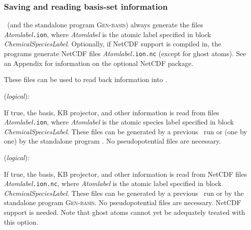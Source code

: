 \subsubsection{Saving and reading basis-set information}

\siesta\ (and the standalone program \textsc{Gen-basis})
always generate the files
\textit{Atomlabel}\texttt{.ion}, where \textit{Atomlabel} is the atomic label
specified in block \textit{ChemicalSpeciesLabel}.  Optionally, if
NetCDF support is compiled in, the programs generate
NetCDF files 
\textit{Atomlabel}\texttt{.ion.nc} (except for ghost atoms).
See an Appendix for information on the optional NetCDF package.

These files can be used to read back information into \siesta.

\begin{description}
\itemsep 10pt
\parsep 0pt
\item[\textbf{User.Basis}] (\textit{logical}):

If true, the basis, KB projector, and other information is read from
files \textit{Atomlabel}\texttt{.ion}, where \textit{Atomlabel} is the atomic
species label specified in block \textit{ChemicalSpeciesLabel}. These
files can be generated by a previous \siesta\ run or (one by one) by the
standalone program . No pseudopotential 
files are necessary.

\item[\textbf{User.Basis.NetCDF}] (\textit{logical}):

If true, the basis, KB projector, and other information is read from
NetCDF files \textit{Atomlabel}\texttt{.ion.nc}, where \textit{Atomlabel} is
the atomic label specified in block \textit{ChemicalSpeciesLabel}. These
files can be generated by a previous \siesta\ run or by the
standalone program \textsc{Gen-basis}. No pseudopotential 
files are necessary. NetCDF support is needed. Note that ghost atoms
cannot yet be adequately treated with this option.

\end{description}


